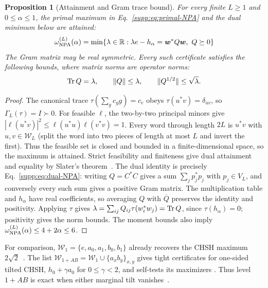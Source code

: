\documentclass[11pt]{article}
\newtheorem{proposition}[theorem]{Proposition}
\theoremstyle{remark}\newtheorem{remark}[theorem]{Remark}
\newcommand{\R}{\mathbb R}\newcommand{\C}{\mathbb C}
\begin{document}
\begin{proposition}[Attainment and Gram trace bound]
\label{supp:prop:duality}\label{supp:lem:trace-identity}
For every finite $L\geq1$ and $0\leq\alpha\leq1$, the primal maximum in
Eq.~\eqref{supp:eq:primal-NPA} and the dual minimum below are attained:
\begin{equation}
\omega_{\rm NPA}^{(L)}(\alpha)
=\min\{\lambda\in\R:\lambda e-h_\alpha=\bm w^*Q\bm w,\ Q\succeq0\}
\label{supp:eq:dual-NPA}
\end{equation}
The Gram matrix may be real symmetric. Every such certificate satisfies
the following bounds, where matrix norms are operator norms:
\begin{equation}
\operatorname{Tr} Q=\lambda,\qquad \|Q\|\leq\lambda,\qquad
\|Q^{1/2}\|\leq\sqrt\lambda.
\label{supp:eq:trace-Q}
\end{equation}
\end{proposition}
\begin{proof}
The canonical trace $\tau(\sum_gc_gg)=c_e$ obeys
$\tau(u^*v)=\delta_{uv}$, so $\Gamma_L(\tau)=I\succ0$.
For feasible $\ell$, the two-by-two principal minors give
$|\ell(u^*v)|^2\leq\ell(u^*u)\ell(v^*v)=1$.
Every word through length $2L$ is $u^*v$ with $u,v\in\mathcal W_L$
(split the word into two pieces of length at most $L$ and invert the first).
Thus the feasible set is closed and bounded in a finite-dimensional space,
so the maximum is attained. Strict feasibility and finiteness give dual
attainment and equality by Slater's theorem~\cite{BoydVandenberghe2004}.
The dual identity is precisely Eq.~\eqref{supp:eq:dual-NPA}: writing
$Q=C^*C$ gives a sum $\sum_jp_j^*p_j$ with $p_j\in V_L$, and conversely
every such sum gives a positive Gram matrix. The multiplication table and
$h_\alpha$ have real coefficients, so averaging $Q$ with $\overline Q$
preserves the identity and positivity. Applying $\tau$ gives
$\lambda=\sum_{ij}Q_{ij}\tau(w_i^*w_j)=\operatorname{Tr} Q$, since $\tau(h_\alpha)=0$;
positivity gives the norm bounds. The moment bounds also imply
$\omega_{\rm NPA}^{(L)}(\alpha)\leq4+2\alpha\leq6$.
\end{proof}

For comparison, $\mathcal W_1=\{e,a_0,a_1,b_0,b_1\}$ already recovers
the CHSH maximum $2\sqrt2$~\cite{Tsirelson1980,NPA2007}. The list
$\mathcal W_{1+AB}=\mathcal W_1\cup\{a_xb_y\}_{x,y}$ gives tight
certificates for one-sided tilted CHSH,
$h_0+\gamma a_0$ for $0\leq\gamma<2$, and self-tests its maximizers
\cite{AMP2012,BampsPironio2015,SupicBowles2020}. Thus level $1+AB$ is
exact when either marginal tilt vanishes~\cite{GigenaEtAl2025}.
\end{document}
